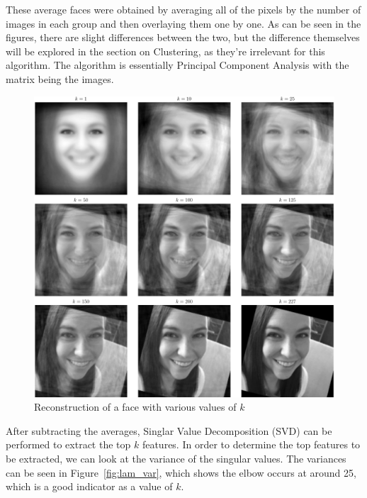 \documentclass{article}
\begin{document}
These average faces were obtained by averaging all of the pixels by the number of images in each group and then overlaying them one by one. As can be seen in the figures, there are slight differences between the two, but the difference themselves will be explored in the section on Clustering, as they're irrelevant for this algorithm. The algorithm is essentially Principal Component Analysis with the matrix being the images. 

\begin{figure}
  \centering
  \includegraphics[width=.65\textwidth]{data/Face_Reconstruct.pdf}
  \caption{Reconstruction of a face with various values of $k$}
  \label{fig:recon}
\end{figure}

After subtracting the averages, Singlar Value Decomposition (SVD) can be performed to extract the top $k$ features. In order to determine the top features to be extracted, we can look at the variance of the singular values. The variances can be seen in Figure~\ref{fig:lam_var}, which shows the elbow occurs at around 25, which is a good indicator as a value of $k$. 
\end{document}
